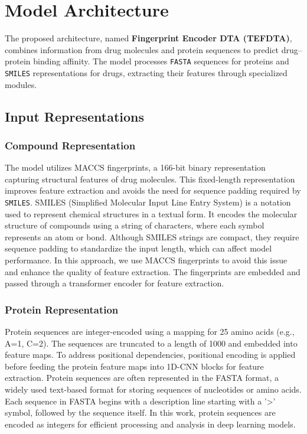 \documentclass{article}
\begin{document}
\section{Model Architecture}
The proposed architecture, named \textbf{Fingerprint Encoder DTA (TEFDTA)}, combines information from drug molecules and protein sequences to predict drug–protein binding affinity. The model processes \texttt{FASTA} sequences for proteins and \texttt{SMILES} representations for drugs, extracting their features through specialized modules.

\subsection{Input Representations}
\subsubsection{Compound Representation}
The model utilizes MACCS fingerprints, a 166-bit binary representation capturing structural features of drug molecules. This fixed-length representation improves feature extraction and avoids the need for sequence padding required by \texttt{SMILES}. SMILES (Simplified Molecular Input Line Entry System) is a notation used to represent chemical structures in a textual form. It encodes the molecular structure of compounds using a string of characters, where each symbol represents an atom or bond. Although SMILES strings are compact, they require sequence padding to standardize the input length, which can affect model performance. In this approach, we use MACCS fingerprints to avoid this issue and enhance the quality of feature extraction. The fingerprints are embedded and passed through a transformer encoder for feature extraction.

\subsubsection{Protein Representation}
Protein sequences are integer-encoded using a mapping for 25 amino acids (e.g., A=1, C=2). The sequences are truncated to a length of 1000 and embedded into feature maps. To address positional dependencies, positional encoding is applied before feeding the protein feature maps into 1D-CNN blocks for feature extraction. Protein sequences are often represented in the FASTA format, a widely used text-based format for storing sequences of nucleotides or amino acids. Each sequence in FASTA begins with a description line starting with a '>' symbol, followed by the sequence itself. In this work, protein sequences are encoded as integers for efficient processing and analysis in deep learning models.
\end{document}
